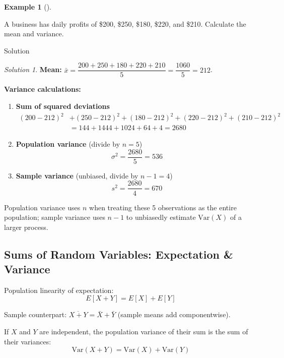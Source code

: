 \documentclass[
  12pt,
  a4paper,
]{scrbook}
\providecommand{\tightlist}{%
  \setlength{\itemsep}{0pt}\setlength{\parskip}{0pt}}
\renewcommand{\tightlist}{\setlength{\itemsep}{0.5\baselineskip}\setlength{\parskip}{0.2\baselineskip}}
\theoremstyle{plain}
\theoremstyle{definition}
\newtheorem{example}{Example}[chapter]
\theoremstyle{remark}
\newtheorem{refsolution}{Solution}[chapter]
\begin{document}
\begin{example}[]\protect\hypertarget{exm-4}{}\label{exm-4}

A business has daily profits of {\$200, \$250, \$180, \$220, and \$210}.
Calculate the mean and variance.

\end{example}

Solution

\begin{refsolution}
\textbf{Mean:}
\(\bar{x}=\dfrac{200+250+180+220+210}{5}=\dfrac{1060}{5}=212\).

\textbf{Variance calculations:}

\begin{enumerate}
\def\labelenumi{\arabic{enumi}.}
\tightlist
\item
  \textbf{Sum of squared deviations}\\
  \[
  \begin{aligned}
  (200-212)^2 &+ (250-212)^2 + (180-212)^2 + (220-212)^2 + (210-212)^2 \\
  &= 144 + 1444 + 1024 + 64 + 4 = 2680
  \end{aligned}
  \]
\item
  \textbf{Population variance} (divide by \(n=5\))\\
  \[ \sigma^2 = \frac{2680}{5} = 536 \]
\item
  \textbf{Sample variance} (unbiased, divide by \(n-1=4\))\\
  \[ s^2 = \frac{2680}{4} = 670 \]
\end{enumerate}

Population variance uses \(n\) when treating these 5 observations as the
entire population; sample variance uses \(n-1\) to unbiasedly estimate
\(\text{Var}(X)\) of a larger process.

\label{sol-4}

\end{refsolution}

\subsection{Sums of Random Variables: Expectation \&
Variance}\label{sums-of-random-variables-expectation-variance}

Population linearity of expectation: \[
E[X + Y] = E[X] + E[Y]
\]

Sample counterpart: \(\overline{X+Y} = \bar{X} + \bar{Y}\) (sample means
add componentwise).

If \(X\) and \(Y\) are independent, the population variance of their sum
is the sum of their variances:
\[\text{Var}(X + Y) = \text{Var}(X) + \text{Var}(Y)\]
\end{document}
